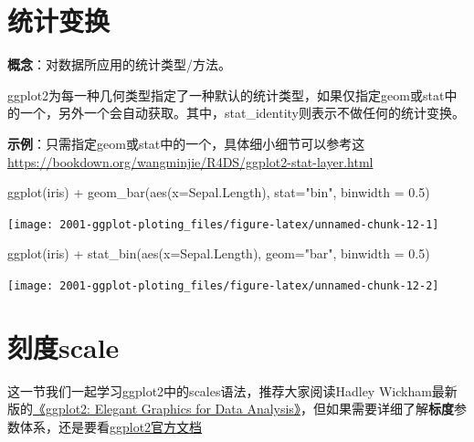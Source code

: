 \documentclass[
]{book}
\newenvironment{Shaded}{\begin{snugshade}}{\end{snugshade}}
\newcommand{\AttributeTok}[1]{\textcolor[rgb]{0.77,0.63,0.00}{#1}}
\newcommand{\FloatTok}[1]{\textcolor[rgb]{0.00,0.00,0.81}{#1}}
\newcommand{\FunctionTok}[1]{\textcolor[rgb]{0.00,0.00,0.00}{#1}}
\newcommand{\NormalTok}[1]{#1}
\newcommand{\SpecialCharTok}[1]{\textcolor[rgb]{0.00,0.00,0.00}{#1}}
\newcommand{\StringTok}[1]{\textcolor[rgb]{0.31,0.60,0.02}{#1}}
\begin{document}
\hypertarget{ux7edfux8ba1ux53d8ux6362}{%
\section{统计变换}\label{ux7edfux8ba1ux53d8ux6362}}

\textbf{概念}：对数据所应用的统计类型/方法。

ggplot2为每一种几何类型指定了一种默认的统计类型，如果仅指定geom或stat中的一个，另外一个会自动获取。其中，stat\_identity则表示不做任何的统计变换。

\textbf{示例}：只需指定geom或stat中的一个，具体细小细节可以参考这
\url{https://bookdown.org/wangminjie/R4DS/ggplot2-stat-layer.html}

\begin{Shaded}
\begin{Highlighting}[]
\FunctionTok{ggplot}\NormalTok{(iris) }\SpecialCharTok{+} 
  \FunctionTok{geom\_bar}\NormalTok{(}\FunctionTok{aes}\NormalTok{(}\AttributeTok{x=}\NormalTok{Sepal.Length), }\AttributeTok{stat=}\StringTok{"bin"}\NormalTok{, }\AttributeTok{binwidth =} \FloatTok{0.5}\NormalTok{)}
\end{Highlighting}
\end{Shaded}

\begin{center}\texttt{[image: 2001-ggplot-ploting\_files/figure-latex/unnamed-chunk-12-1]} \end{center}

\begin{Shaded}
\begin{Highlighting}[]
\FunctionTok{ggplot}\NormalTok{(iris) }\SpecialCharTok{+} 
  \FunctionTok{stat\_bin}\NormalTok{(}\FunctionTok{aes}\NormalTok{(}\AttributeTok{x=}\NormalTok{Sepal.Length), }\AttributeTok{geom=}\StringTok{"bar"}\NormalTok{, }\AttributeTok{binwidth =} \FloatTok{0.5}\NormalTok{)}
\end{Highlighting}
\end{Shaded}

\begin{center}\texttt{[image: 2001-ggplot-ploting\_files/figure-latex/unnamed-chunk-12-2]} \end{center}

\hypertarget{ux523bux5ea6scale}{%
\section{刻度scale}\label{ux523bux5ea6scale}}

这一节我们一起学习ggplot2中的scales语法，推荐大家阅读Hadley
Wickham最新版的\href{https://ggplot2-book.org/}{《ggplot2: Elegant Graphics for Data
Analysis》}，但如果需要详细了解\textbf{标度}参数体系，还是要看\href{https://cran.r-project.org/web/packages/ggplot2/index.html}{ggplot2官方文档}
\end{document}
